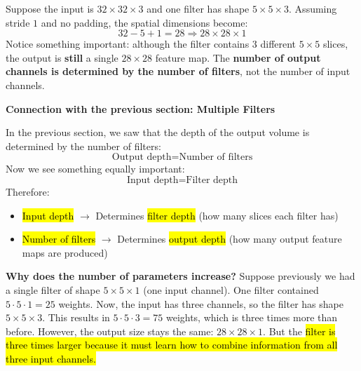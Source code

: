 \begin{examplebox}
    Suppose the input is $32 \times 32 \times 3$ and one filter has shape $5 \times 5 \times 3$. Assuming stride $1$ and no padding, the spatial dimensions become:
    \begin{equation*}
        32 - 5 + 1 = 28 \Rightarrow 28 \times 28 \times 1
    \end{equation*}
    Notice something important: although the filter contains 3 different $5 \times 5$ slices, the output is \textbf{still} a single $28 \times 28$ feature map. The \textbf{number of output channels is determined by the number of filters}, not the number of input channels.
\end{examplebox}

\highspace
\begin{flushleft}
    \textcolor{Green3}{ \textbf{Connection with the previous section: Multiple Filters}}
\end{flushleft}
In the previous section, we saw that the depth of the output volume is determined by the number of filters:
\begin{equation*}
    \text{Output depth} = \text{Number of filters}
\end{equation*}
Now we see something equally important:
\begin{equation*}
    \text{Input depth} = \text{Filter depth}
\end{equation*}
Therefore:
\begin{itemize}
    \item \hl{Input depth} $\to$ Determines \hl{filter depth} (how many slices each filter has)
    \item \hl{Number of filters} $\to$ Determines \hl{output depth} (how many output feature maps are produced)
\end{itemize}
\textcolor{Green3}{ \textbf{Why does the number of parameters increase?}} Suppose previously we had a single filter of shape $5 \times 5 \times 1$ (one input channel). One filter contained $5 \cdot 5 \cdot 1 = 25$ weights. Now, the input has three channels, so the filter has shape $5 \times 5 \times 3$. This results in $5 \cdot 5 \cdot 3 = 75$ weights, which is three times more than before. However, the output size stays the same: $28 \times 28 \times 1$. But the \hl{filter is three times larger because it must learn how to combine information from all three input channels.}

